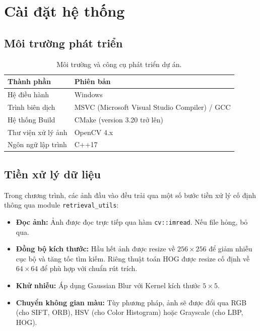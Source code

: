 \chapter{Cài đặt hệ thống}

\section{Môi trường phát triển}
\begin{table}[H]
\centering
\begin{tabularx}{\textwidth}{|X|X|}
\hline
\textbf{Thành phần} & \textbf{Phiên bản} \\
\hline
Hệ điều hành & Windows \\
\hline
Trình biên dịch & MSVC (Microsoft Visual Studio Compiler) / GCC \\
\hline
Hệ thống Build & CMake (version 3.20 trở lên) \\
\hline
Thư viện xử lý ảnh & OpenCV 4.x \\
\hline
Ngôn ngữ lập trình & C++17 \\
\hline
\end{tabularx}
\caption{Môi trường và công cụ phát triển dự án.}
\end{table}

\section{Tiền xử lý dữ liệu}
Trong chương trình, các ảnh đầu vào đều trải qua một số bước tiền xử lý cố định thông qua module \texttt{retrieval\_utils}:
\begin{itemize}
    \item \textbf{Đọc ảnh:} Ảnh được đọc trực tiếp qua hàm \texttt{cv::imread}. Nếu file hỏng, bỏ qua.
    \item \textbf{Đồng bộ kích thước:} Hầu hết ảnh được resize về $256 \times 256$ để giảm nhiễu cục bộ và tăng tốc tìm kiếm. Riêng thuật toán HOG được resize cố định về $64 \times 64$ để phù hợp với chuẩn rút trích.
    \item \textbf{Khử nhiễu:} Áp dụng Gaussian Blur với Kernel kích thước $5 \times 5$.
    \item \textbf{Chuyển không gian màu:} Tùy phương pháp, ảnh sẽ được đổi qua RGB (cho SIFT, ORB), HSV (cho Color Histogram) hoặc Grayscale (cho LBP, HOG).
\end{itemize}

